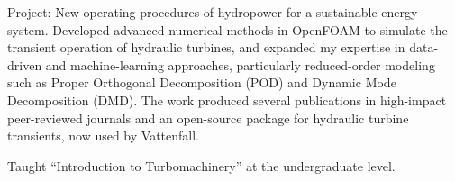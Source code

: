 \begin{cvbody}
Project: New operating procedures of hydropower for a sustainable energy system. Developed advanced numerical methods in OpenFOAM to simulate the transient operation of hydraulic turbines, and expanded my expertise in data-driven and machine-learning approaches, particularly reduced-order modeling such as Proper Orthogonal Decomposition (POD) and Dynamic Mode Decomposition (DMD). The work produced several publications in high-impact peer-reviewed journals and an open-source package for hydraulic turbine transients, now used by Vattenfall.
\end{cvbody}

\begin{cvbody}
Taught ``Introduction to Turbomachinery'' at the undergraduate level.
\end{cvbody}
